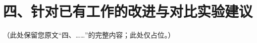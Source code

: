 \documentclass[11pt]{article}
\begin{document}
\section*{四、针对已有工作的改进与对比实验建议}
（此处保留您原文“四、……”的完整内容；此处仅占位。）

\clearpage

\end{document}
